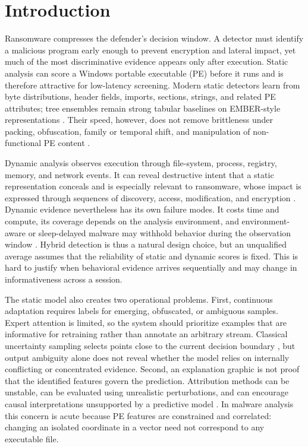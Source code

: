 \section{Introduction}
\label{sec:introduction}

Ransomware compresses the defender's decision window. A detector must identify a
malicious program early enough to prevent encryption and lateral impact, yet much
of the most discriminative evidence appears only after execution. Static analysis
can score a Windows portable executable (PE) before it runs and is therefore
attractive for low-latency screening. Modern static detectors learn from byte
distributions, header fields, imports, sections, strings, and related PE
attributes; tree ensembles remain strong tabular baselines on EMBER-style
representations \cite{anderson2018ember,harang2020sorel,ke2017lightgbm}. Their
speed, however, does not remove brittleness under packing, obfuscation, family or
temporal shift, and manipulation of non-functional PE content
\cite{ucci2019survey,gibert2020rise,arp2022dos}.

Dynamic analysis observes execution through file-system, process, registry,
memory, and network events. It can reveal destructive intent that a static
representation conceals and is especially relevant to ransomware, whose impact
is expressed through sequences of discovery, access, modification, and
encryption \cite{alrimy2018survey,kharraz2015cutting,bacci2021ransomware}.
Dynamic evidence nevertheless has its own failure modes. It costs time and
compute, its coverage depends on the analysis environment, and environment-aware
or sleep-delayed malware may withhold behavior during the observation window
\cite{sgandurra2016automated,sikorski2012practical}. Hybrid detection is thus a
natural design choice, but an unqualified average assumes that the reliability of
static and dynamic scores is fixed. This is hard to justify when behavioral
evidence arrives sequentially and may change in informativeness across a session.

The static model also creates two operational problems. First, continuous
adaptation requires labels for emerging, obfuscated, or ambiguous samples.
Expert attention is limited, so the system should prioritize examples that are
informative for retraining rather than annotate an arbitrary stream. Classical
uncertainty sampling selects points close to the current decision boundary
\cite{settles2009active,cohn1996active}, but output ambiguity alone does not reveal
whether the model relies on internally conflicting or concentrated evidence.
Second, an explanation graphic is not proof that the identified features govern
the prediction. Attribution methods can be unstable, can be evaluated using
unrealistic perturbations, and can encourage causal interpretations unsupported
by a predictive model \cite{guidotti2018survey,yeh2019infidelity,
warnecke2020evaluating}. In malware analysis this concern is acute because PE
features are constrained and correlated: changing an isolated coordinate in a
vector need not correspond to any executable file.

